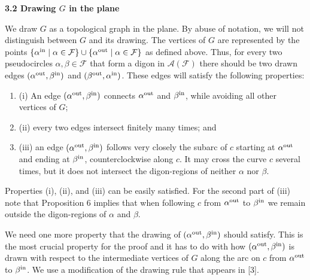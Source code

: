\documentclass[10pt,a4paper]{amsart}
\providecommand{\cal}{\mathcal}
\begin{document}
\par
\par
\par
\par\medskip\noindent\textbf{3.2 Drawing $G$ in the plane}\par
We draw $G$ as a topological graph in the plane. By abuse of notation, we will not distinguish between $G$ and its drawing. The vertices of $G$ are represented by the points $\{\alpha^{\rm in}\mid\alpha\in{\cal{F}}\}\cup\{\alpha^{\rm out}\mid\alpha\in{%
\cal{F}}\}$ as defined above. Thus, for every two pseudocircles $\alpha,\beta\in{\cal{F}}$ that form a digon in ${\cal{A}}({\cal{F}})$ there should be two drawn edges $(\alpha^{\rm out},\beta^{\rm in})$ and $(\beta^{\rm out},\alpha^{\rm in})$. These edges will satisfy the following properties:
\par
\begin{enumerate}
\item[]  (i) 
An edge $(\alpha^{\rm out},\beta^{\rm in})$ connects $\alpha^{\rm out}$ and $\beta^{\rm in}$, while avoiding all other vertices of $G$;
\par
\par
\item[]  (ii) 
every two edges intersect finitely many times; and
\par
\par
\item[]  (iii) 
an edge $(\alpha^{\rm out},\beta^{\rm in})$ follows very closely the subarc of $c$ starting at $\alpha^{\rm out}$ and ending at $\beta^{\rm in}$, counterclockwise along $c$. It may cross the curve $c$ several times, but it does not intersect the digon-regions of neither $\alpha$ nor $\beta$.
\par
\par
\end{enumerate}
\par
Properties (i), (ii), and (iii) can be easily satisfied. For the second part of (iii) note that Proposition 6 implies that when following $c$ from $\alpha^{\rm out}$ to $\beta^{\rm in}$ we remain outside the digon-regions of $\alpha$ and $\beta$.
\par
\par
We need one more property that the drawing of $(\alpha^{\rm out},\beta^{\rm in})$ should satisfy. This is the most crucial property for the proof and it has to do with how $(\alpha^{\rm out},\beta^{\rm in})$ is drawn with respect to the intermediate vertices of $G$ along the arc on $c$ from $\alpha^{\rm out}$ to $\beta^{\rm in}$. We use a modification of the drawing rule that appears in [3].
\end{document}
